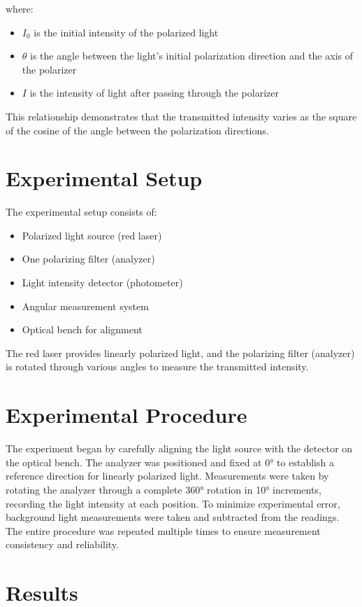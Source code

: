 \documentclass[journal]{IEEEtran}
\begin{document}
where:
\begin{itemize}
    \item $I_0$ is the initial intensity of the polarized light
    \item $\theta$ is the angle between the light's initial polarization direction and the axis of the polarizer
    \item $I$ is the intensity of light after passing through the polarizer
\end{itemize}

This relationship demonstrates that the transmitted intensity varies as the square of the cosine of the angle between the polarization directions.

\section{Experimental Setup}
The experimental setup consists of:
\begin{itemize}
    \item Polarized light source (red laser)
    \item One polarizing filter (analyzer)
    \item Light intensity detector (photometer)
    \item Angular measurement system
    \item Optical bench for alignment
\end{itemize}

The red laser provides linearly polarized light, and the polarizing filter (analyzer) is rotated through various angles to measure the transmitted intensity.

\section{Experimental Procedure}
The experiment began by carefully aligning the light source with the detector on the optical bench. The analyzer was positioned and fixed at 0° to establish a reference direction for linearly polarized light. Measurements were taken by rotating the analyzer through a complete 360° rotation in 10° increments, recording the light intensity at each position. To minimize experimental error, background light measurements were taken and subtracted from the readings. The entire procedure was repeated multiple times to ensure measurement consistency and reliability.

\section{Results}
\end{document}
